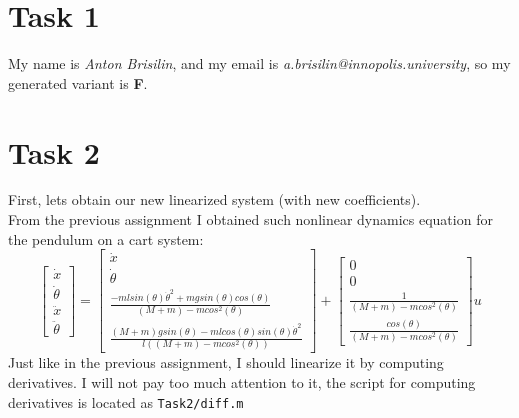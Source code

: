 \documentclass[a4paper,12pt]{article}
\begin{document}
\section{Task 1}
My name is \textit{Anton Brisilin}, and my email is 
\textit{a.brisilin@innopolis.university}, so my generated variant is \textbf{F}.

\section{Task 2}
First, lets obtain our new linearized system (with new coefficients).\\
From the previous assignment I obtained such nonlinear dynamics equation 
for the pendulum on a cart system:
\begin{equation*}
    \begin{bmatrix}
        \dot x\\
        \dot \theta\\
        \ddot x\\
        \ddot \theta    
    \end{bmatrix}
    =
    \begin{bmatrix}
        \dot x\\
        \dot \theta\\
        \frac
        {- mlsin(\theta)\dot \theta^2 + mgsin(\theta)cos(\theta)}
        {(M+m) - mcos^2(\theta)}\\
        \frac
        {(M+m)gsin(\theta) - mlcos(\theta)sin(\theta)\dot \theta^2}
        {l((M+m) - mcos^2(\theta))}
    \end{bmatrix}
    +
    \begin{bmatrix}
        0\\0\\
        \frac
        {1}
        {(M+m) - mcos^2(\theta)}\\
        \frac
        {cos(\theta)}
        {(M+m) - mcos^2(\theta)}
    \end{bmatrix}
    u
\end{equation*}
Just like in the previous assignment, I should linearize it by computing derivatives.
I will not pay too much attention to it, the script for computing derivatives is 
located as \texttt{Task2/diff.m}
\end{document}
